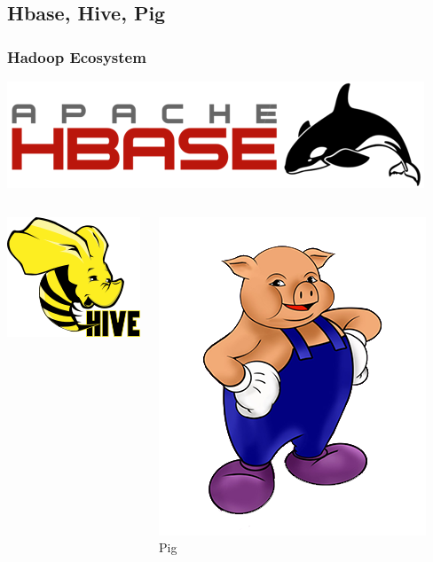 \documentclass{beamer}
\begin{document}
\subsection{Hbase, Hive, Pig}
\begin{frame}
  \frametitle{Hadoop Ecosystem}
  \begin{center}
    \includegraphics[height=0.25\textheight]{../images/hbase.png}
    \vspace{4mm}
    \begin{columns}
      \begin{center}
        \includegraphics[height=0.3\textheight]{../images/hive.png}
      \end{center}
      \begin{center}
        \includegraphics[height=0.3\textheight]{../images/pig.png}
        \\ {\LARGE Pig}
      \end{center}
    \end{columns}
  \end{center}
\end{frame}
\end{document}
